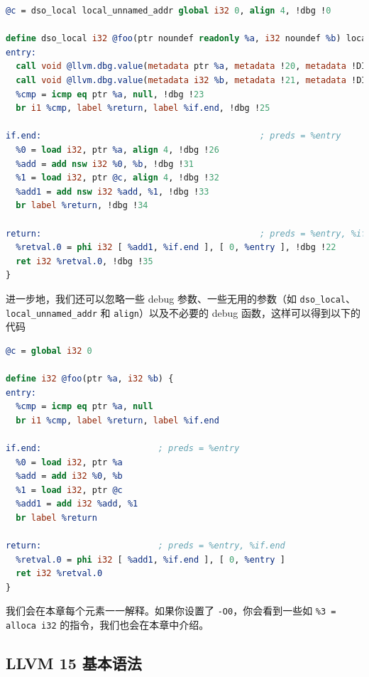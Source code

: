 \begin{lstlisting}[language=llvm]
@c = dso_local local_unnamed_addr global i32 0, align 4, !dbg !0

define dso_local i32 @foo(ptr noundef readonly %a, i32 noundef %b) local_unnamed_addr #0 !dbg !15 {
entry:
  call void @llvm.dbg.value(metadata ptr %a, metadata !20, metadata !DIExpression()), !dbg !22
  call void @llvm.dbg.value(metadata i32 %b, metadata !21, metadata !DIExpression()), !dbg !22
  %cmp = icmp eq ptr %a, null, !dbg !23
  br i1 %cmp, label %return, label %if.end, !dbg !25

if.end:                                           ; preds = %entry
  %0 = load i32, ptr %a, align 4, !dbg !26
  %add = add nsw i32 %0, %b, !dbg !31
  %1 = load i32, ptr @c, align 4, !dbg !32
  %add1 = add nsw i32 %add, %1, !dbg !33
  br label %return, !dbg !34

return:                                           ; preds = %entry, %if.end
  %retval.0 = phi i32 [ %add1, %if.end ], [ 0, %entry ], !dbg !22
  ret i32 %retval.0, !dbg !35
}
\end{lstlisting}

进一步地，我们还可以忽略一些 debug 参数、一些无用的参数（如
\texttt{dso\_local}、\texttt{local\_unnamed\_addr} 和
\texttt{align}）以及不必要的 debug 函数，这样可以得到以下的代码

\begin{lstlisting}[language=llvm]
@c = global i32 0

define i32 @foo(ptr %a, i32 %b) {
entry:
  %cmp = icmp eq ptr %a, null
  br i1 %cmp, label %return, label %if.end

if.end:                       ; preds = %entry
  %0 = load i32, ptr %a
  %add = add i32 %0, %b
  %1 = load i32, ptr @c
  %add1 = add i32 %add, %1
  br label %return

return:                       ; preds = %entry, %if.end
  %retval.0 = phi i32 [ %add1, %if.end ], [ 0, %entry ]
  ret i32 %retval.0
}
\end{lstlisting}

我们会在本章每个元素一一解释。如果你设置了 \texttt{-O0}，你会看到一些如
\texttt{\%3 = alloca i32} 的指令，我们也会在本章中介绍。

\subsection{LLVM 15 基本语法}


